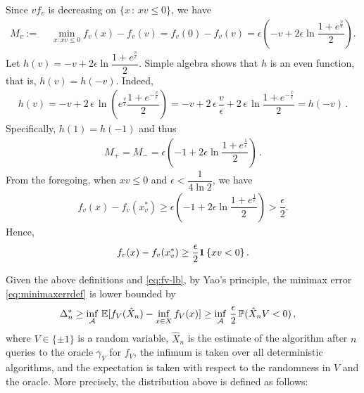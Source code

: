 Since $v f_v$ is decreasing on $\{x\,:\, xv \le 0\}$, we have
\begin{align*}
M_v :=&\,\, \min_{x:xv \le 0} f_v(x) - f_v(v) 
=   f_v(0) - f_v(v)  
=  \epsilon\left(-v + 2\epsilon\ln\dfrac{1+e^{\frac{v}{\epsilon}}}{2}\right). \nonumber %
\end{align*}
Let $h(v) = -v + 2\epsilon\ln\dfrac{1+e^{\frac{v}{\epsilon}}}{2}$.
Simple algebra shows that $h$ is an even function, that is, $h(v) = h(-v)$. Indeed,
\begin{align*}
h(v) = -v + 2\,\epsilon\,\ln\left(e^{\frac{v}{\epsilon}} \dfrac{1+e^{-\frac{v}{\epsilon}}}{2}\right)
= -v + 2\,\epsilon\, \dfrac{v}{\epsilon}  + 2\,\epsilon\,\ln\dfrac{1+e^{-\frac{v}{\epsilon}}}{2}
=  h(-v)\,.
\end{align*}
Specifically, $h(1) = h(-1)$ and thus
\begin{align*}
M_+= M_- = \epsilon\left(-1 + 2\epsilon\ln\dfrac{1+e^{\frac{1}{\epsilon}}}{2}\right)\,.
\end{align*}
From the foregoing, when $xv \le 0$ and $\epsilon<\dfrac{1}{4\ln 2}$,  we have
\begin{align*}
f_v(x)-f_v(x_v^*) \ge \epsilon\left( -1 +2\epsilon \ln\dfrac{1+e^{\frac{1}{\epsilon}}}{2}  \right)> \dfrac{\epsilon}{2}.
\end{align*}
Hence,
\begin{align}
  f_v(x) - f_v(x^*_v)
  \ge \dfrac{\epsilon}{2}  \mathbf{1}\left\{x v  < 0\right\}. \label{eq:fv-lb}
\end{align}


Given the above definitions and \eqref{eq:fv-lb}, by Yao's principle, the minimax error \eqref{eq:minimaxerrdef} is lower bounded by
\begin{align}
\MoveEqLeft 
\Delta_n^{*} %
  \ge  \inf_{\A} \,  \E[f_V(\hat X_n) - \inf_{x \in X}  f_V(x)]
  \ge \inf_{\A} \, \dfrac{\epsilon}{2}\,  \P(\hat X_n V < 0)\,,
  \label{eq:avg-bd}
  \end{align}
where $V \in \{\pm 1\}$ is a random variable, $\hat{X}_n$ is the estimate of the algorithm after $n$ queries to the oracle $\gamma_V$ for $f_V$, the infimum is taken over all deterministic algorithms, and the expectation is taken with respect to the randomness in $V$ and the oracle. More precisely, the distribution above is defined as follows:

